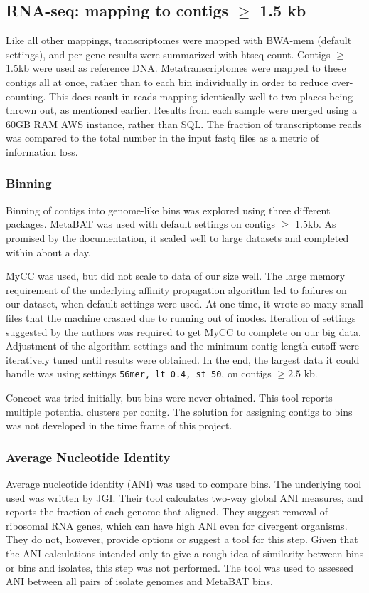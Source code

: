 \subsection{RNA-seq: mapping to contigs $\geq$ 1.5 kb}
Like all other mappings, transcriptomes were mapped with BWA-mem (default settings), and per-gene results were summarized with htseq-count.
Contigs $\geq$ 1.5kb were used as reference DNA.
Metatranscriptomes were mapped to these contigs all at once, rather than to each bin individually in order to reduce over-counting.
This does result in reads mapping identically well to two places being thrown out, as mentioned earlier.
Results from each sample were merged using a 60GB RAM AWS instance, rather than SQL.
The fraction of transcriptome reads was compared to the total number in the input fastq files as a metric of information loss.

\subsubsection{Binning}

Binning of contigs into genome-like bins was explored using three different packages.
MetaBAT was used with default settings on contigs $\geq$ 1.5kb.
As promised by the documentation, it scaled well to large datasets and completed within about a day.

MyCC was used, but did not scale to data of our size well.
The large memory requirement of the underlying affinity propagation algorithm led to failures on our dataset, when default settings were used.
At one time, it wrote so many small files that the machine crashed due to running out of inodes.
Iteration of settings suggested by the authors was required to get MyCC to complete on our big data.
Adjustment of the algorithm settings and the minimum contig length cutoff were iteratively tuned until results were obtained.
In the end, the largest data it could handle was using settings \texttt{56mer, lt 0.4, st 50}, on contigs $\geq 2.5$ kb.

Concoct was tried initially, but bins were never obtained.
This tool reports multiple potential clusters per conitg.
The solution for assigning contigs to bins was not developed in the time frame of this project.

\subsubsection{Average Nucleotide Identity}
Average nucleotide identity (ANI) was used to compare bins.
The underlying tool used was written by JGI. %
Their tool calculates two-way global ANI measures, and reports the fraction of each genome that aligned.
They suggest removal of ribosomal RNA genes, which can have high ANI even for divergent organisms.
They do not, however, provide options or suggest a tool for this step.
Given that the ANI calculations intended only to give a rough idea of similarity between bins or bins and isolates, this step was not performed.
The tool was used to assessed ANI between all pairs of isolate genomes and MetaBAT bins.

